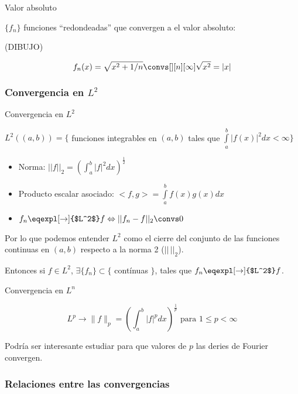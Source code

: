 		\begin{example}{Valor absoluto}

			$\{f_n\}$ funciones ``redondeadas'' que convergen a el valor absoluto:

			(DIBUJO)

			\[f_n(x) = \sqrt{x^2 + 1/n} \convs[][n][\infty] \sqrt{x^2} = |x| \]

		\end{example}



	\subsubsection{Convergencia en $L^2$}

		\begin{defn}{Convergencia en $L^2$}

			$L^2((a,b)) = \{$ funciones integrables en $(a,b)$ tales que $\int\limits_{a}^{b} |f(x)|^2 dx < \infty \}$

			\begin{itemize}
				\item Norma: $||f||_2 = \left( \int^{b}_{a} |f|^2 dx \right)^{\frac{1}{2}}$

				\item Producto escalar asociado: $<f,g> = \int\limits^b_a f(x) g(x) dx $

				\item $f_n \eqexpl[\rightarrow]{$L^2$} f \Leftrightarrow ||f_n - f||_2 \convs 0 $
			\end{itemize}

			Por lo que podemos entender $L^2$ como el cierre del conjunto de las funciones continuas en $(a,b)$ respecto a la norma 2 ($||\,||_2$).

			Entonces si $f \in L^2$, $\exists \{f_n\} \subset \{$ contínuas $\}$, tales que $f_n \eqexpl[\rightarrow]{$L^2$}f$.
		\end{defn}

		\begin{defn}{Convergencia en $L^n$}

			\[L^p \rightarrow \|f\|_{p} = \left( \int^{b}_a |f|^p dx \right)^{\frac{1}{p}} \text{ para } 1 \leq p < \infty \]

		\end{defn}

			Podría ser interesante estudiar para que valores de $p$ las deries de Fourier convergen.

	\subsubsection{Relaciones entre las convergencias}

